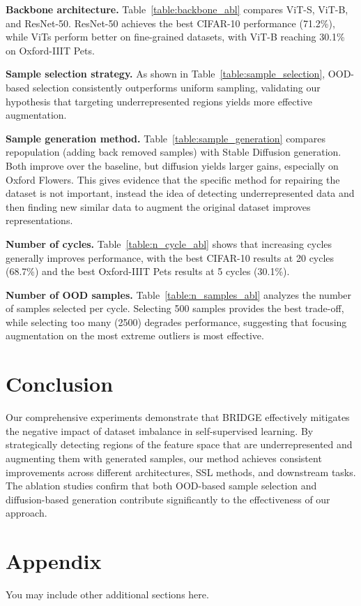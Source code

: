 \documentclass{article} %
\begin{document}
\noindent\textbf{Backbone architecture.} 
Table~\ref{table:backbone_abl} compares ViT-S, ViT-B, and ResNet-50. ResNet-50 achieves the best CIFAR-10 performance (71.2\%), while ViTs perform better on fine-grained datasets, with ViT-B reaching 30.1\% on Oxford-IIIT Pets.  

\noindent\textbf{Sample selection strategy.} 
As shown in Table~\ref{table:sample_selection}, OOD-based selection consistently outperforms uniform sampling, validating our hypothesis that targeting underrepresented regions yields more effective augmentation.  

\noindent\textbf{Sample generation method.} 
Table~\ref{table:sample_generation} compares repopulation (adding back removed samples) with Stable Diffusion generation. Both improve over the baseline, but diffusion yields larger gains, especially on Oxford Flowers. This gives evidence that the specific method for repairing the dataset is not important, instead the idea of detecting underrepresented data and then finding new similar data to augment the original dataset improves representations.

\noindent\textbf{Number of cycles.} 
Table~\ref{table:n_cycle_abl} shows that increasing cycles generally improves performance, with the best CIFAR-10 results at 20 cycles (68.7\%) and the best Oxford-IIIT Pets results at 5 cycles (30.1\%).  

\noindent\textbf{Number of OOD samples.} 
Table~\ref{table:n_samples_abl} analyzes the number of samples selected per cycle. Selecting 500 samples provides the best trade-off, while selecting too many (2500) degrades performance, suggesting that focusing augmentation on the most extreme outliers is most effective.


\section{Conclusion}
Our comprehensive experiments demonstrate that BRIDGE effectively mitigates the negative impact of dataset imbalance in self-supervised learning. By strategically detecting regions of the feature space that are underrepresented and augmenting them with generated samples, our method achieves consistent improvements across different architectures, SSL methods, and downstream tasks. The ablation studies confirm that both OOD-based sample selection and diffusion-based generation contribute significantly to the effectiveness of our approach.





\appendix
\section{Appendix}
You may include other additional sections here.
\end{document}
